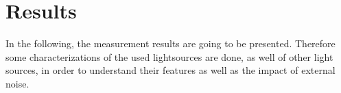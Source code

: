 
\section{Results}
\label{sec:Results}

In the following, the measurement results are going to be presented. 
Therefore some characterizations of the used lightsources are done, as well of other light sources, in order to understand their features as well as the impact of external noise.
